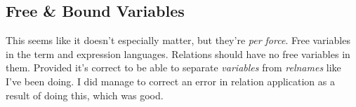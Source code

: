\documentclass[11pt,twoside]{article}
\numberwithin{equation}{subsection} %
\begin{document}



\subsection{Free \& Bound Variables}

This seems like it doesn't especially matter, but they're \emph{per force}. Free variables in the term and expression languages. Relations should
have no free variables in them. Provided it's correct to be able to
separate \emph{variables} from \emph{relnames} like I've been doing. I
did manage to correct an error in relation application as a result of doing this,
which was good.

\vspace{.5cm}
\end{document}
